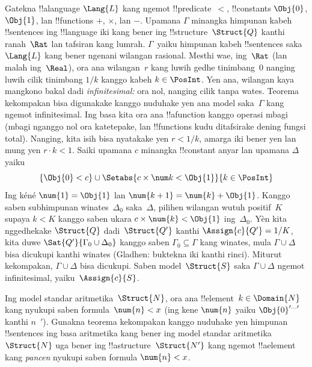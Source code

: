 \documentclass[../../../include/open-logic-section]{subfiles}
\begin{document}
{\begin{ex}
Gatekna !!a{language} $\Lang{L}$ kang ngemot !!{predicate}~$<$,
!!{constant}s $\Obj{0}$, $\Obj{1}$, lan !!{function}s $+$, $\times$,
lan $-$. Upamana $\Gamma$ minangka himpunan kabeh !!{sentence}s ing
!!{language} iki kang bener ing !!{structure}~$\Struct{Q}$ kanthi
ranah~$\Rat$ lan tafsiran kang lumrah. $\Gamma$~yaiku himpunan kabeh
!!{sentence}s saka~$\Lang{L}$ kang bener ngenani wilangan rasional.
Mesthi wae, ing~$\Rat$ (lan malah ing~$\Real$), ora ana wilangan~$r$
kang luwih gedhe tinimbang~$0$ nanging luwih cilik tinimbang $1/k$
kanggo kabeh $k \in \PosInt$. Yen ana, wilangan kaya mangkono bakal
dadi \emph{infinitesimal:} ora nol, nanging cilik tanpa wates.
Teorema kekompakan bisa digunakake kanggo nuduhake yen ana model
saka~$\Gamma$ kang ngemot infinitesimal. Ing basa kita ora ana
!!a{function} kanggo operasi mbagi (mbagi nganggo nol ora katetepake,
lan !!{function}s kudu ditafsirake dening fungsi total). Nanging, kita
isih bisa nyatakake yen $r < 1/k$, amarga iki bener yen lan mung yen
$r \cdot k < 1$. Saiki upamana $c$ minangka !!{constant} anyar lan
upamana $\Delta$ yaiku
\[
\{\Obj{0} < c\}
\cup \Setabs{ c \times \num k < \Obj{1} }{k \in \PosInt}
\]
Ing kéné $\num{1}=\Obj{1}$ lan $\num{k+1}=\num{k}+\Obj{1}$.
Kanggo saben subhimpunan winates~$\Delta_0$ saka~$\Delta$,
pilihen wilangan wutuh positif~$K$ supaya $k<K$ kanggo saben ukara
$c \times \num{k} < \Obj{1}$ ing~$\Delta_0$. Yèn
kita nggedhekake $\Struct{Q}$ dadi~$\Struct{Q'}$ kanthi
$\Assign{c}{Q'} = 1/K$, kita duwe
$\Sat{Q'}{\Gamma_0 \cup \Delta_0}$ kanggo saben $\Gamma_0 \subseteq
\Gamma$ kang winates, mula $\Gamma \cup \Delta$ bisa dicukupi kanthi
winates (Gladhen: buktekna iki kanthi rinci). Miturut kekompakan,
$\Gamma \cup \Delta$ bisa dicukupi. Saben model~$\Struct{S}$ saka
$\Gamma \cup \Delta$ ngemot infinitesimal, yaiku~$\Assign{c}{S}$.
\end{ex}
}{}

\begin{prob}
Ing model standar aritmetika~$\Struct{N}$, ora ana !!{element}~$k \in
\Domain{N}$ kang nyukupi saben formula~$\num{n} < x$ (ing kene
$\num{n}$ yaiku $\Obj{0}^{\prime\dots\prime}$ kanthi $n$~$\prime$).
Gunakna teorema kekompakan kanggo nuduhake yen himpunan
!!{sentence}s ing basa aritmetika kang bener ing model standar
aritmetika $\Struct{N}$ uga bener ing !!a{structure}~$\Struct{N'}$
kang ngemot !!a{element} kang \emph{pancen} nyukupi saben formula
$\num{n} < x$.
\end{prob}
\tagendprob
\end{document}

